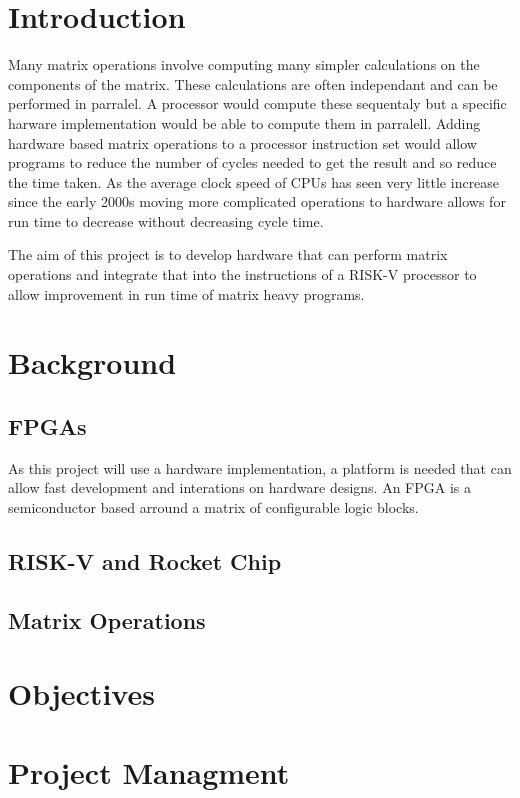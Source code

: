 \documentclass[a4paper,fleqn,12pt]{article}
\begin{document}


\pagestyle{plain}

\section{Introduction}
Many matrix operations involve computing many simpler calculations on the components of the matrix. These calculations are often independant and can be performed in parralel. A processor would compute these sequentaly but a specific harware implementation would be able to compute them in parralell. Adding hardware based matrix operations to a processor instruction set would allow programs to reduce the number of cycles needed to get the result and so reduce the time taken. As the average clock speed of CPUs has seen very little increase since the early 2000s moving more complicated operations to hardware allows for run time to decrease without decreasing cycle time.

The aim of this project is to develop hardware that can perform matrix operations and integrate that into the instructions of a RISK-V processor to allow improvement in run time of matrix heavy programs.

\section{Background}
\subsection{FPGAs}
As this project will use a hardware implementation, a platform is needed that can allow fast development and interations on hardware designs. An FPGA is a semiconductor based arround a matrix of configurable logic blocks.\citep{whatisanfpga}

\subsection{RISK-V and Rocket Chip}

\subsection{Matrix Operations}

\section{Objectives}

\section{Project Managment}



\end{document}
